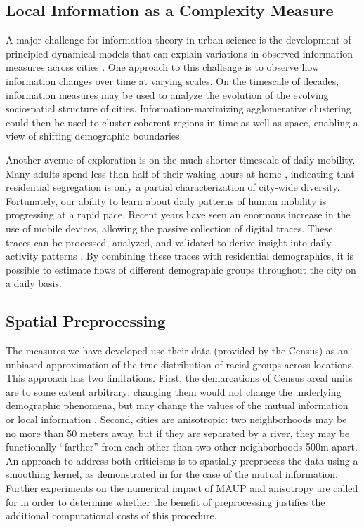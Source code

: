 \documentclass[9pt,twocolumn,twoside]{pnas-new}
\begin{document}
	\subsection*{Local Information as a Complexity Measure}
		A major challenge for information theory in urban science is the development of principled dynamical models that can explain variations in observed information measures across cities \cite{Batty2014a}. One approach to this challenge is to observe how information changes over time at varying scales. On the timescale of decades, information measures may be used to analyze the evolution of the evolving sociospatial structure of cities. Information-maximizing agglomerative clustering could then be used to cluster coherent regions in time as well as space, enabling a view of shifting demographic boundaries.

		Another avenue of exploration is on the much shorter timescale of daily mobility. Many adults spend less than half of their waking hours at home \cite{BureauofLaborStati2014}, indicating that residential segregation is only a partial characterization of city-wide diversity. Fortunately, our ability to learn about daily patterns of human mobility is progressing at a rapid pace. Recent years have seen an enormous increase in the use of mobile devices, allowing the passive collection of digital traces. These traces can be processed, analyzed, and validated to derive insight into daily activity patterns \cite{Widhalm2015,Yang,Jiang2013,Jiang2012c}. By combining these traces with residential demographics, it is possible to estimate flows of different demographic groups throughout the city on a daily basis. 
	\subsection*{Spatial Preprocessing}
		The measures we have developed use their data (provided by the Census) as an unbiased approximation of the true distribution of racial groups across locations. This approach has two limitations. First, the demarcations of Census areal units are to some extent arbitrary: changing them would not change the underlying demographic phenomena, but may change the values of the mutual information or local information \cite{Openshaw1981}. Second, cities are anisotropic: two neighborhoods may be no more than 50 meters away, but if they are separated by a river, they may be functionally ``farther'' from each other than two other neighborhoods 500m apart. An approach to address both criticisms is to spatially preprocess the data using a smoothing kernel, as demonstrated in \cite{Roberto2015} for the case of the mutual information. Further experiments on the numerical impact of MAUP and anisotropy are called for in order to determine whether the benefit of preprocessing justifies the additional computational costs of this procedure.   
\end{document}
